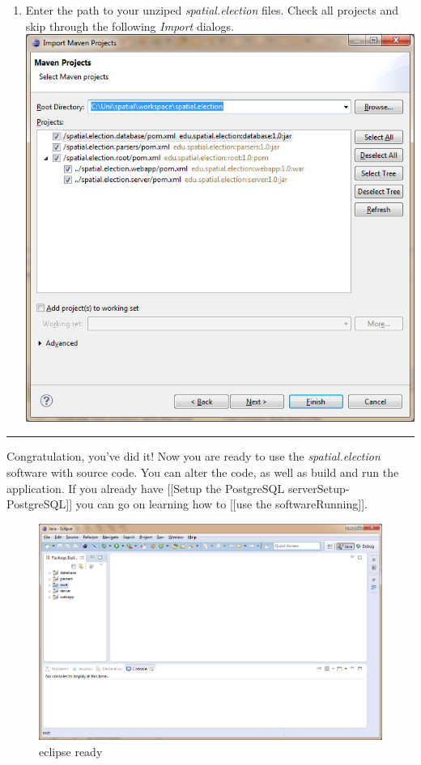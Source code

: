 \begin{enumerate}
\item
  Enter the path to your unziped \emph{spatial.election} files. Check
  all projects and skip through the following \emph{Import} dialogs.
  \includegraphics[width=1.1\textwidth]{../img/vBZ4xNA.png}
\end{enumerate}

\begin{center}\rule{3in}{0.4pt}\end{center}

Congratulation, you've did it! Now you are ready to use the
\emph{spatial.election} software with source code. You can alter the
code, as well as build and run the application. If you already have
{[}{[}Setup the PostgreSQL server\textbar{}Setup-PostgreSQL{]}{]} you
can go on learning how to {[}{[}use the software\textbar{}Running{]}{]}.

\begin{figure}[htbp]
\centering
\includegraphics[width=1.1\textwidth]{../img/EeGnXjg.png}
\caption{eclipse ready}
\end{figure}